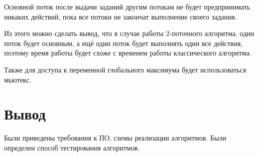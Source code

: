 Основной поток после выдачи заданий другим потокам не будет предпринимать никаких действий,
пока все потоки не закончат выполнение своего задания.

Из этого можно сделать вывод, что в случае работы 2-поточного алгоритма, один поток будет основным,
а ещё один поток будет выполнять один все действия, поэтому время работы будет схоже с временем работы
классического алгоритма.

Также для доступа к переменной глобального максимума будет использоваться мьютекс.

\section{Вывод}
Были приведены требования к ПО, схемы реализации алгоритмов.
Были определен способ тестирования алгоритмов.